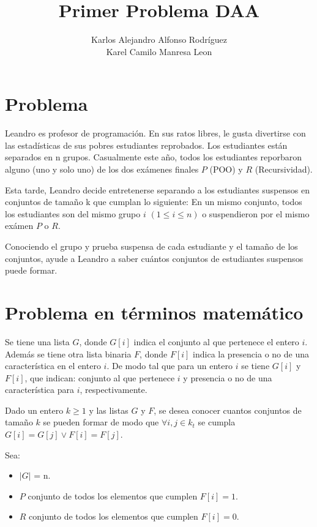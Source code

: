 \documentclass{article}
\begin{document}
\title{Primer Problema DAA}
\author{Karlos Alejandro Alfonso Rodríguez \\ Karel Camilo Manresa Leon}
\maketitle

\newpage

\section*{Problema}

Leandro es profesor de programación. En sus ratos libres, le gusta divertirse con las 
estadísticas de sus pobres estudiantes reprobados. Los estudiantes están separados en n grupos. 
Casualmente este año, todos los estudiantes reporbaron alguno (uno y solo uno) de los dos exámenes 
finales $P$ (POO) y $R$ (Recursividad).

Esta tarde, Leandro decide entretenerse separando a los estudiantes
suspensos en conjuntos de tamaño k que cumplan lo siguiente: En un mismo conjunto, todos los estudiantes 
son del mismo grupo $i$ $(1 \leq i \leq n)$ o suspendieron por el mismo exámen $P$ o $R$.

Conociendo el grupo y prueba suspensa de cada estudiante y el tamaño de los conjuntos, 
ayude a Leandro a saber cuántos conjuntos de estudiantes suspensos puede formar.

\section*{Problema en términos matemático}

Se tiene una lista $G$, donde $G[i]$ indica el conjunto al que pertenece el entero $i$.
Además se tiene otra lista binaria $F$, donde $F[i]$ indica la presencia o no de una característica en 
el entero $i$. De modo tal que para un entero $i$ se tiene $G[i]$ y $F[i]$, que 
indican: conjunto al que pertenece $i$ y presencia o no de una característica para $i$, respectivamente.

Dado un entero $k \geq 1$ y las listas $G$ y $F$, se desea conocer cuantos conjuntos de tamaño $k$ se pueden formar 
de modo que $\forall i,j \in k_t$ se cumpla $G[i] = G[j] \vee F[i] = F[j]$.

Sea:
\begin{itemize}
    \item $|G|$ = n.
    \item $P$ conjunto de todos los elementos que cumplen $F[i] = 1$.
    \item $R$ conjunto de todos los elementos que cumplen $F[i] = 0$.
\end{itemize}
\end{document}
